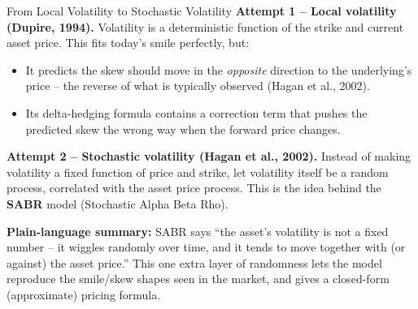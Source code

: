 \documentclass[aspectratio=169,10pt]{beamer}
\begin{document}
\begin{frame}{From Local Volatility to Stochastic Volatility}
  \textbf{Attempt 1 -- Local volatility (Dupire, 1994).} Volatility is a
  deterministic function of the strike and current asset price. This fits
  today's smile perfectly, but:
  \begin{itemize}
    \item It predicts the skew should move in the \emph{opposite} direction to
      the underlying's price -- the reverse of what is typically observed
      (Hagan et al., 2002).
    \item Its delta-hedging formula contains a correction term that pushes the
      predicted skew the wrong way when the forward price changes.
  \end{itemize}

  \vspace{2mm}
  \textbf{Attempt 2 -- Stochastic volatility (Hagan et al., 2002).} Instead of
  making volatility a fixed function of price and strike, let volatility
  \alert{itself be a random process}, correlated with the asset price process.
  This is the idea behind the \textbf{SABR} model (Stochastic Alpha Beta Rho).

  \vspace{2mm}
  \textbf{Plain-language summary:} SABR says ``the asset's volatility is not
  a fixed number -- it wiggles randomly over time, and it tends to move together
  with (or against) the asset price.'' This one extra layer of randomness lets
  the model reproduce the smile/skew shapes seen in the market, and gives a
  closed-form (approximate) pricing formula.
\end{frame}
\end{document}
